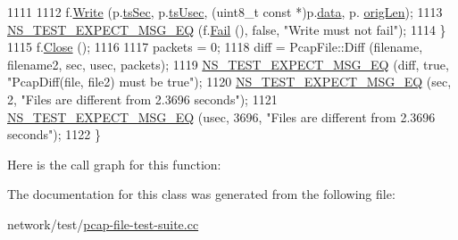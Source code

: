 \begin{DoxyCode}
1111 
1112       f.\hyperlink{classns3_1_1PcapFile_a3920f5bae95ca0021875e6e9c2630ccf}{Write} (p.\hyperlink{structPACKET__ENTRY_abea31e5c174a03ab6359271d6f63a648}{tsSec}, p.\hyperlink{structPACKET__ENTRY_a0c46e357bf2e2eec6d097408062f3cf1}{tsUsec}, (uint8\_t \textcolor{keyword}{const} *)p.\hyperlink{structPACKET__ENTRY_a44b794b18286d3bd159417ad67597e6f}{data}, p.
      \hyperlink{structPACKET__ENTRY_a2eb0d1882b86fd106ad82d3138273004}{origLen});
1113       \hyperlink{group__testing_ga7304ba46a28d8cf08dfdfd6499cf7068}{NS\_TEST\_EXPECT\_MSG\_EQ} (f.\hyperlink{classns3_1_1PcapFile_a2e00aa080890a0c9c3e9f5bd2d6c21d5}{Fail} (), \textcolor{keyword}{false}, \textcolor{stringliteral}{"Write must not fail"});
1114     \}
1115   f.\hyperlink{classns3_1_1PcapFile_ad3b6c28d464742ee1fa3a64628339a5b}{Close} ();
1116 
1117   packets = 0;
1118   diff = PcapFile::Diff (filename, filename2, sec, usec, packets);
1119   \hyperlink{group__testing_ga7304ba46a28d8cf08dfdfd6499cf7068}{NS\_TEST\_EXPECT\_MSG\_EQ} (diff, \textcolor{keyword}{true}, \textcolor{stringliteral}{"PcapDiff(file, file2) must be true"});
1120   \hyperlink{group__testing_ga7304ba46a28d8cf08dfdfd6499cf7068}{NS\_TEST\_EXPECT\_MSG\_EQ} (sec,  2, \textcolor{stringliteral}{"Files are different from 2.3696 seconds"});
1121   \hyperlink{group__testing_ga7304ba46a28d8cf08dfdfd6499cf7068}{NS\_TEST\_EXPECT\_MSG\_EQ} (usec, 3696, \textcolor{stringliteral}{"Files are different from 2.3696 seconds"});
1122 \}
\end{DoxyCode}


Here is the call graph for this function\+:




The documentation for this class was generated from the following file\+:\begin{DoxyCompactItemize}
\item 
network/test/\hyperlink{pcap-file-test-suite_8cc}{pcap-\/file-\/test-\/suite.\+cc}\end{DoxyCompactItemize}
